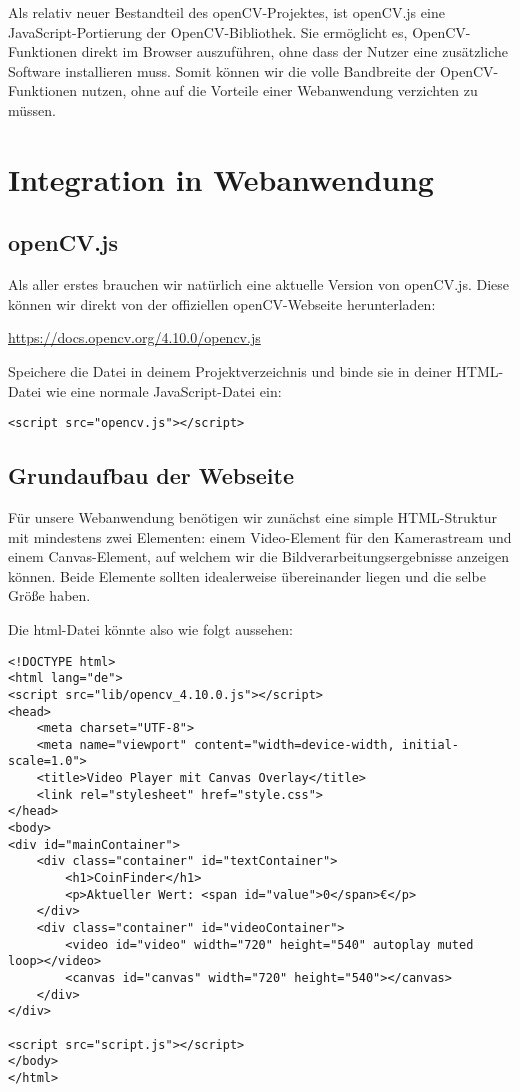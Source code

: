 \documentclass{article}
\begin{document}
Als relativ neuer Bestandteil des openCV-Projektes, ist openCV.js eine JavaScript-Portierung der OpenCV-Bibliothek. Sie ermöglicht es, OpenCV-Funktionen direkt im Browser auszuführen, ohne dass der Nutzer eine zusätzliche Software installieren muss. Somit können wir die volle Bandbreite der OpenCV-Funktionen nutzen, ohne auf die Vorteile einer Webanwendung verzichten zu müssen.

\section{Integration in Webanwendung}
\subsection{openCV.js}
Als aller erstes brauchen wir natürlich eine aktuelle Version von openCV.js. Diese können wir direkt von der offiziellen openCV-Webseite herunterladen:

\href{https://docs.opencv.org/4.10.0/opencv.js}{https://docs.opencv.org/4.10.0/opencv.js}

Speichere die Datei in deinem Projektverzeichnis und binde sie in deiner HTML-Datei wie eine normale JavaScript-Datei ein:

\begin{lstlisting}[style=HTML]
<script src="opencv.js"></script>
\end{lstlisting}


\subsection{Grundaufbau der Webseite}
Für unsere Webanwendung benötigen wir zunächst eine simple HTML-Struktur mit mindestens zwei Elementen: einem Video-Element für den Kamerastream und einem Canvas-Element, auf welchem wir die Bildverarbeitungsergebnisse anzeigen können. Beide Elemente sollten idealerweise übereinander liegen und die selbe Größe haben.

Die html-Datei könnte also wie folgt aussehen:
\begin{lstlisting}[style=HTML]
    <!DOCTYPE html>
<html lang="de">
<script src="lib/opencv_4.10.0.js"></script>
<head>
    <meta charset="UTF-8">
    <meta name="viewport" content="width=device-width, initial-scale=1.0">
    <title>Video Player mit Canvas Overlay</title>
    <link rel="stylesheet" href="style.css">
</head>
<body>
<div id="mainContainer">
    <div class="container" id="textContainer">
        <h1>CoinFinder</h1>
        <p>Aktueller Wert: <span id="value">0</span>€</p>
    </div>
    <div class="container" id="videoContainer">
        <video id="video" width="720" height="540" autoplay muted loop></video>
        <canvas id="canvas" width="720" height="540"></canvas>
    </div>
</div>

<script src="script.js"></script>
</body>
</html>
\end{lstlisting}
\end{document}
